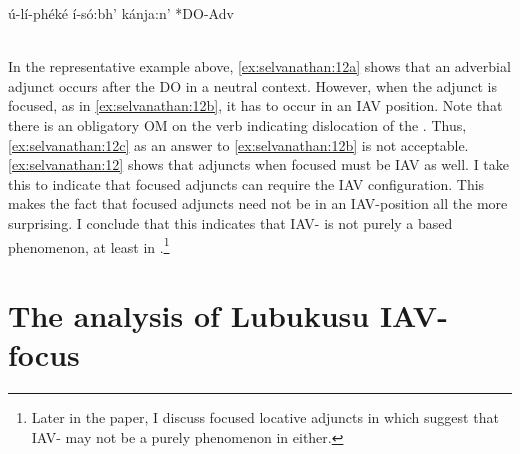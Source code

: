 \documentclass[output=paper
,newtxmath
,modfonts
,nonflat]{langsci/langscibook}
\begin{document}
\ex\label{ex:selvanathan:12c}
	\gll *ú-lí-phéké     í-só:bh’  kánja:n’     *DO-Adv\\
	\\	
\z
\z

In the representative example above, \ref{ex:selvanathan:12a} shows that an adverbial adjunct occurs after the DO in a neutral context. However, when the adjunct is focused, as in \ref{ex:selvanathan:12b}, it has to occur in an IAV position. Note that there is an obligatory OM on the verb indicating dislocation of the . Thus, \ref{ex:selvanathan:12c} as an answer to \ref{ex:selvanathan:12b} is not acceptable. \ref{ex:selvanathan:12} shows that  adjuncts when focused must be IAV as well. I take this to indicate that focused adjuncts can require the IAV configuration. This makes the fact that  focused adjuncts need not be in an IAV-position all the more surprising. I conclude that this indicates that IAV- is not purely a  based phenomenon, at least in .\footnote{Later in the paper, I discuss focused locative adjuncts in  which suggest that IAV- may not be a purely  phenomenon in  either.}  

\section{The analysis of Lubukusu IAV-focus}\label{sec:selvanathan:5}
\end{document}
